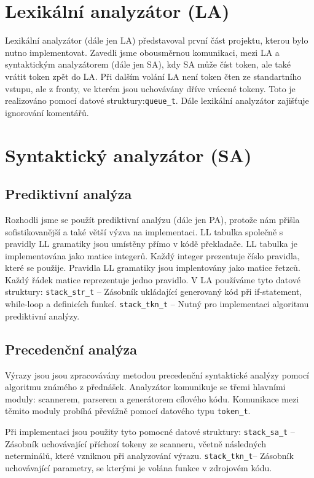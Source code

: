 \documentclass[11pt, a4paper]{article}
\begin{document}
\section{Lexikální analyzátor (LA)}
Lexikální analyzátor (dále jen LA) představoval první část projektu, kterou bylo nutno implementovat. Zavedli jsme obousměrnou komunikaci, mezi LA a syntaktickým analyzátorem (dále jen SA), kdy SA může číst token, ale také vrátit token zpět do LA. Při dalším volání LA není token čten ze standartního vstupu, ale z fronty, ve kterém jsou uchovávány dříve vrácené tokeny. Toto je realizováno pomocí datové struktury:\verb|queue_t|. 
Dále lexikální analyzátor zajišťuje ignorování komentářů. 

\section{Syntaktický analyzátor (SA)}
\subsection{Prediktivní analýza}
Rozhodli jsme se použít prediktivní analýzu (dále jen PA), protože nám přišla sofistikovanější a také větší výzva na implementaci. LL tabulka společně s pravidly LL gramatiky jsou umístěny přímo v kódě překladače. LL tabulka je implementována jako matice integerů. Každý integer prezentuje číslo pravidla, které se použije. Pravidla LL gramatiky jsou implentovány jako matice řetzců. Každý řádek matice reprezentuje jedno pravidlo. V LA používáme tyto datové struktury:\newline
\verb|stack_str_t| -- Zásobník ukládající generovaný kód při if-statement, while-loop a definicích funkcí.\newline
\verb|stack_tkn_t| -- Nutný pro implementaci algoritmu prediktivní analýzy. \newline

\subsection{Precedenční analýza}
Výrazy jsou jsou zpracovávány metodou precedenční syntaktické analýzy pomocí algoritmu známého z přednášek. Analyzátor komunikuje se třemi hlavními moduly: scannerem, parserem a generátorem cílového kódu. Komunikace mezi těmito moduly probíhá převážně pomocí datového typu \verb|token_t|.

Při implementaci jsou použity tyto pomocné datové struktury:
       \verb|stack_sa_t| -- Zásobník uchovávající příchozí tokeny ze scanneru, včetně následných neterminálů, které vzniknou při analyzování výrazu.
       \verb|stack_tkn_t|-- Zásobník uchovávající parametry, se kterými je volána funkce v zdrojovém kódu.
\end{document}
